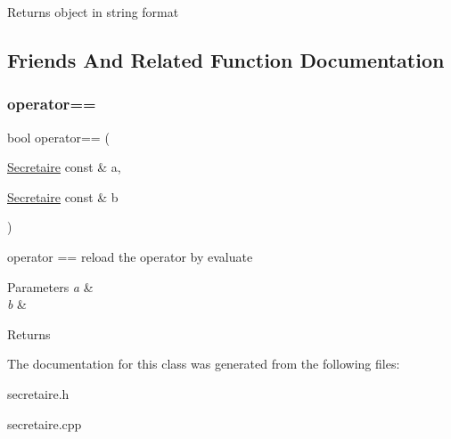 \begin{DoxyReturn}{Returns}
object in string format 
\end{DoxyReturn}


\subsection{Friends And Related Function Documentation}
\mbox{\label{class_secretaire_a112c35bb24507c5a861a7f84542bcdea}} 
\subsubsection{\texorpdfstring{operator==}{operator==}}
{\footnotesize\ttfamily bool operator== (\begin{DoxyParamCaption}\item[{\mbox{\hyperlink{class_secretaire}{Secretaire}} const \&}]{a,  }\item[{\mbox{\hyperlink{class_secretaire}{Secretaire}} const \&}]{b }\end{DoxyParamCaption})\hspace{0.3cm}{\ttfamily [friend]}}



operator == reload the operator by evaluate 


\begin{DoxyParams}{Parameters}
{\em a} & \\
\hline
{\em b} & \\
\hline
\end{DoxyParams}
\begin{DoxyReturn}{Returns}

\end{DoxyReturn}


The documentation for this class was generated from the following files\+:\begin{DoxyCompactItemize}
\item 
secretaire.\+h\item 
secretaire.\+cpp\end{DoxyCompactItemize}
